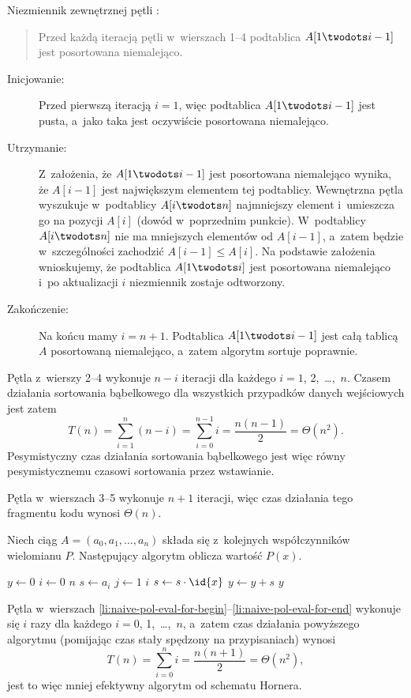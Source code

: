 \subproblem %
Niezmiennik zewnętrznej pętli :
\begin{quote}
Przed każdą iteracją pętli  w~wierszach 1\nobreakdash--4 podtablica $A[1\twodots i-1]$ jest posortowana niemalejąco.
\end{quote}
\begin{description}
	\item[Inicjowanie:] Przed pierwszą iteracją $i=1$, więc podtablica $A[1\twodots i-1]$ jest pusta, a~jako taka jest oczywiście posortowana niemalejąco.
	\item[Utrzymanie:] Z~założenia, że $A[1\twodots i-1]$ jest posortowana niemalejąco wynika, że $A[i-1]$ jest największym elementem tej podtablicy. Wewnętrzna pętla  wyszukuje w~podtablicy $A[i\twodots n]$ najmniejszy element i~umieszcza go na pozycji $A[i]$ (dowód w~poprzednim punkcie). W~podtablicy $A[i\twodots n]$ nie ma mniejszych elementów od $A[i-1]$, a~zatem będzie w~szczególności zachodzić $A[i-1]\le A[i]$. Na podstawie założenia wnioskujemy, że podtablica $A[1\twodots i]$ jest posortowana niemalejąco i~po aktualizacji $i$ niezmiennik zostaje odtworzony.
	\item[Zakończenie:] Na końcu mamy $i=n+1$. Podtablica $A[1\twodots i-1]$ jest całą tablicą $A$ posortowaną niemalejąco, a~zatem algorytm sortuje poprawnie.
\end{description}

\subproblem %
Pętla  z~wierszy 2\nobreakdash--4 wykonuje $n-i$ iteracji dla każdego $i=1$, 2,~\dots,~$n$. Czasem działania sortowania bąbelkowego dla wszystkich przypadków danych wejściowych jest zatem
\[
	T(n) = \sum_{i=1}^n(n-i) = \sum_{i=0}^{n-1}i = \frac{n(n-1)}{2} = \Theta(n^2).
\]
Pesymistyczny czas działania sortowania bąbelkowego jest więc równy pesymistycznemu czasowi sortowania przez wstawianie.


\subproblem %
Pętla  w~wierszach 3\nobreakdash--5 wykonuje $n+1$ iteracji, więc czas działania tego fragmentu kodu wynosi $\Theta(n)$.

\subproblem %
Niech ciąg $A=(a_0,a_1,\dots,a_n)$ składa się z~kolejnych współczynników wielomianu $P$. Następujący algorytm oblicza wartość $P(x)$.
\begin{codebox}
\li	$y\gets0$
\li	\For $i\gets0$ \To $n$
\li		\Do
			$s\gets a_i$
\li			\For $j\gets1$ \To $i$ \label{li:naive-pol-eval-for-begin}
\li				\Do $s\gets s\cdot\id{x}$
				\End \label{li:naive-pol-eval-for-end}
\li			$y\gets y+s$
		\End
\li	\Return $y$
\end{codebox}
Pętla  w~wierszach \ref{li:naive-pol-eval-for-begin}\nobreakdash--\ref{li:naive-pol-eval-for-end} wykonuje się $i$ razy dla każdego $i=0$, 1,~\dots,~$n$, a~zatem czas działania powyższego algorytmu (pomijając czas stały spędzony na przypisaniach) wynosi
\[
	T(n) = \sum_{i=0}^ni = \frac{n(n+1)}{2} = \Theta(n^2),
\]
jest to więc mniej efektywny algorytm od schematu Hornera.

